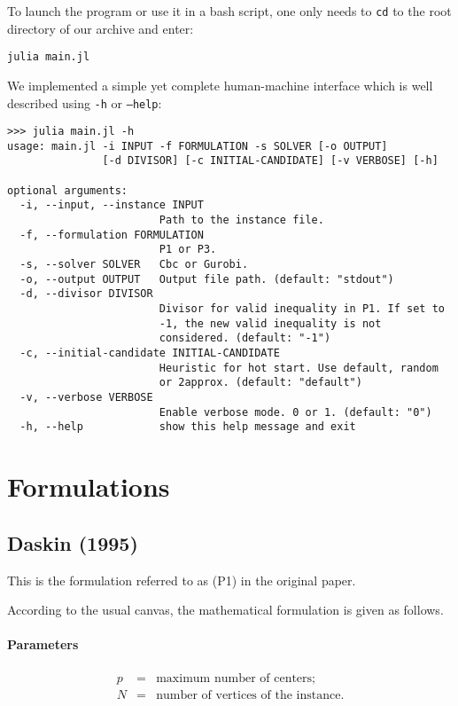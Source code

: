 \documentclass[a4paper,10pt]{article}
\begin{document}
To launch the program or use it in a bash script, one only needs to \texttt{cd} to the root directory of our archive and enter:

\begin{lstlisting}
julia main.jl
\end{lstlisting}

We implemented a simple yet complete human-machine interface which is well described using \texttt{-h} or \texttt{--help}:
\begin{lstlisting}
>>> julia main.jl -h
usage: main.jl -i INPUT -f FORMULATION -s SOLVER [-o OUTPUT]
               [-d DIVISOR] [-c INITIAL-CANDIDATE] [-v VERBOSE] [-h]

optional arguments:
  -i, --input, --instance INPUT
                        Path to the instance file.
  -f, --formulation FORMULATION
                        P1 or P3.
  -s, --solver SOLVER   Cbc or Gurobi.
  -o, --output OUTPUT   Output file path. (default: "stdout")
  -d, --divisor DIVISOR
                        Divisor for valid inequality in P1. If set to
                        -1, the new valid inequality is not
                        considered. (default: "-1")
  -c, --initial-candidate INITIAL-CANDIDATE
                        Heuristic for hot start. Use default, random
                        or 2approx. (default: "default")
  -v, --verbose VERBOSE
                        Enable verbose mode. 0 or 1. (default: "0")
  -h, --help            show this help message and exit
\end{lstlisting}

\section{Formulations}
\subsection{Daskin (1995)}
	This is the formulation referred to as (P1) in the original paper.
	
	According to the usual canvas, the mathematical formulation is given as follows.
	\paragraph{Parameters} 
	\begin{eqnarray*}
		p &=& \text{maximum number of centers;} \\
		N &=& \text{number of vertices of the instance.} 
	\end{eqnarray*}
\end{document}
